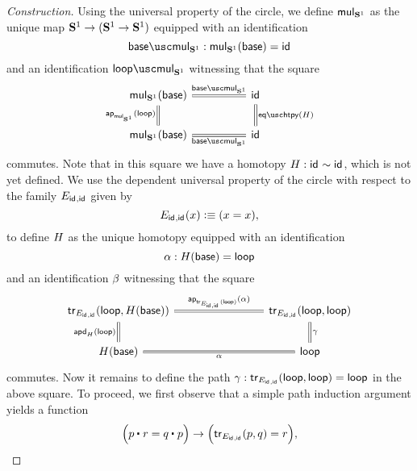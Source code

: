 \begin{proof}[Construction]
  Using the universal property of the circle, we define $\mathsf{mul}_{\mathbf{S}^{1}}$ as the unique map $\mathbf{S}^{1}\to(\mathbf{S}^{1}\to\mathbf{S}^{1})$ equipped with an identification
  \begin{equation*}
    \basemulcircle :\mulcircle(\base)=\idfunc
  \end{equation*}
  and an identification $\loopmulcircle$ witnessing that the square
  \begin{equation*}
    \begin{tikzcd}[column sep=huge]
      \mulcircle(\base) \arrow[r,equals,"\basemulcircle"] \arrow[d,equals,swap,"\ap{\mulcircle}{\lloop}"] & \idfunc \arrow[d,equals,"\eqhtpy(\htpyidcircle)"] \\
      \mulcircle(\base) \arrow[r,equals,swap,"\basemulcircle"] & \idfunc
  \end{tikzcd}
  \end{equation*}
  commutes. Note that in this square we have a homotopy $H:\mathsf{id}_{}\sim\mathsf{id}_{}$, which is not yet defined. We  use the dependent universal property of the circle with respect to the family $E_{\mathsf{id}_{},\mathsf{id}_{}}$ given by
  \begin{equation*}
    E_{\mathsf{id}_{},\mathsf{id}_{}}(x) \vcentcolon\equiv (x=x),
  \end{equation*}
  to define $H$ as the unique homotopy equipped with an identification
  \begin{equation*}
    \alpha : H(\mathsf{base})=\mathsf{loop}
  \end{equation*}
  and an identification $\beta$ witnessing that the square
  \begin{equation*}
    \begin{tikzcd}[column sep=8em]
      \tr_{E_{\idfunc,\idfunc}}(\lloop,\htpyidcircle(\base)) \arrow[r,equals,"\ap{\tr_{E_{\idfunc,\idfunc}}(\lloop)}{\basehtpyidcircle}"] \arrow[d,equals,swap,"\apd{\htpyidcircle}{\lloop}"] & \tr_{E_{\idfunc,\idfunc}}(\lloop,\lloop) \arrow[d,equals,"\gamma"] \\
      \htpyidcircle(\base) \arrow[r,equals,swap,"\basehtpyidcircle"] & \lloop
    \end{tikzcd}
  \end{equation*}
  commutes. Now it remains to define the path $\gamma:\mathsf{tr}_{E_{\mathsf{id}_{},\mathsf{id}_{}}}(\mathsf{loop},\mathsf{loop})=\mathsf{loop}$ in the above square. To proceed, we first observe that a simple path induction argument yields a function
  \begin{equation*}
    \Big(\ct{p}{r}=\ct{q}{p}\Big)\to\Big(\tr_{E_{\idfunc,\idfunc}}(p,q)=r\Big),

\end{equation*}
\end{proof}

